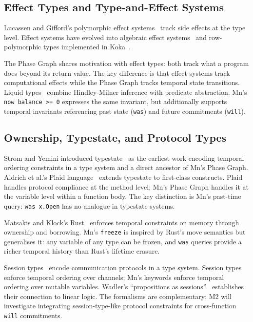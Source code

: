 \documentclass[11pt,a4paper]{article}
\begin{document}
\subsection{Effect Types and Type-and-Effect Systems}

Lucassen and Gifford's polymorphic effect systems~\cite{lucassen1988,gifford1986} track side
effects at the type level. Effect systems have evolved into algebraic effect
systems~\cite{plotkin2009} and row-polymorphic types implemented in Koka~\cite{leijen2014}.

The Phase Graph shares motivation with effect types: both track what a program does beyond its
return value. The key difference is that effect systems track computational effects while the
Phase Graph tracks temporal state transitions. Liquid types~\cite{rondon2008} combine
Hindley-Milner inference with predicate abstraction. Mn's \texttt{now balance >= 0} expresses
the same invariant, but additionally supports temporal invariants referencing past state
(\texttt{was}) and future commitments (\texttt{will}).

\subsection{Ownership, Typestate, and Protocol Types}

Strom and Yemini introduced typestate~\cite{strom1986} as the earliest work encoding temporal
ordering constraints in a type system and a direct ancestor of Mn's Phase Graph. Aldrich et al.'s
Plaid language~\cite{aldrich2009} extends typestate to first-class constructs. Plaid handles
protocol compliance at the method level; Mn's Phase Graph handles it at the variable level within
a function body. The key distinction is Mn's past-time query: \texttt{was x.Open} has no
analogue in typestate systems.

Matsakis and Klock's Rust~\cite{matsakis2014} enforces temporal constraints on memory through
ownership and borrowing. Mn's \texttt{freeze} is inspired by Rust's move semantics but
generalises it: any variable of any type can be frozen, and \texttt{was} queries provide a
richer temporal history than Rust's lifetime erasure.

Session types~\cite{honda1993,honda1998,honda2008} encode communication protocols in a type
system. Session types enforce temporal ordering over channels; Mn's keywords enforce temporal
ordering over mutable variables. Wadler's ``propositions as sessions''~\cite{wadler2014}
establishes their connection to linear logic. The formalisms are complementary; M2 will
investigate integrating session-type-like protocol constraints for cross-function
\texttt{will} commitments.
\end{document}
